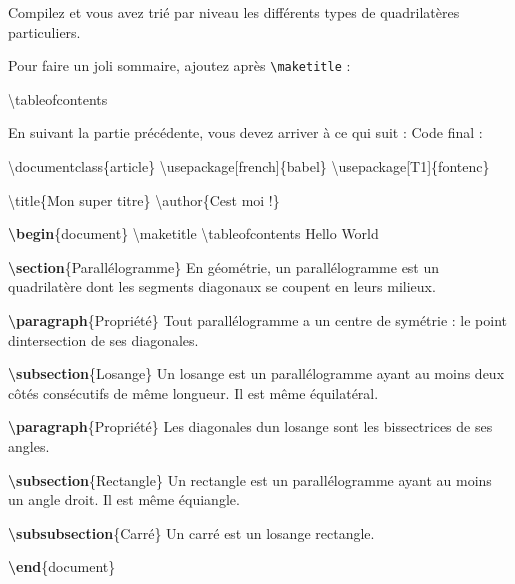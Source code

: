 \documentclass[A4paper
]{article}
\newenvironment{Shaded}{}{}
\newcommand{\BuiltInTok}[1]{#1}
\newcommand{\ExtensionTok}[1]{#1}
\newcommand{\FunctionTok}[1]{\textcolor[rgb]{0.02,0.16,0.49}{#1}}
\newcommand{\KeywordTok}[1]{\textcolor[rgb]{0.00,0.44,0.13}{\textbf{#1}}}
\newcommand{\NormalTok}[1]{#1}
\begin{document}
Compilez et vous avez trié par niveau les différents types de
quadrilatères particuliers.

Pour faire un joli sommaire, ajoutez après
\texttt{\textbackslash{}maketitle} :

\begin{Shaded}
\begin{Highlighting}[]
\FunctionTok{\textbackslash{}tableofcontents}
\end{Highlighting}
\end{Shaded}

En suivant la partie précédente, vous devez arriver à ce qui suit : Code
final :

\begin{Shaded}
\begin{Highlighting}[]
\BuiltInTok{\textbackslash{}documentclass}\NormalTok{\{}\ExtensionTok{article}\NormalTok{\}}
\BuiltInTok{\textbackslash{}usepackage}\NormalTok{[french]\{}\ExtensionTok{babel}\NormalTok{\}}
\BuiltInTok{\textbackslash{}usepackage}\NormalTok{[T1]\{}\ExtensionTok{fontenc}\NormalTok{\}}

\FunctionTok{\textbackslash{}title}\NormalTok{\{Mon super titre\}}
\FunctionTok{\textbackslash{}author}\NormalTok{\{C\textquotesingle{}est moi !\}}

\KeywordTok{\textbackslash{}begin}\NormalTok{\{}\ExtensionTok{document}\NormalTok{\}}
\FunctionTok{\textbackslash{}maketitle}
\FunctionTok{\textbackslash{}tableofcontents}
\NormalTok{Hello World }

\KeywordTok{\textbackslash{}section}\NormalTok{\{Parallélogramme\}}
\NormalTok{En géométrie, un parallélogramme est un quadrilatère dont les segments diagonaux se coupent en leurs milieux.}

\KeywordTok{\textbackslash{}paragraph}\NormalTok{\{Propriété\}}
\NormalTok{Tout parallélogramme a un centre de symétrie : le point d\textquotesingle{}intersection de ses diagonales.}

\KeywordTok{\textbackslash{}subsection}\NormalTok{\{Losange\}}
\NormalTok{Un losange est un parallélogramme ayant au moins deux côtés consécutifs de même longueur. Il est même équilatéral.}

\KeywordTok{\textbackslash{}paragraph}\NormalTok{\{Propriété\} Les diagonales d\textquotesingle{}un losange sont les bissectrices de ses angles.}

\KeywordTok{\textbackslash{}subsection}\NormalTok{\{Rectangle\}}
\NormalTok{Un rectangle est un parallélogramme ayant au moins un angle droit. Il est même équiangle.}

\KeywordTok{\textbackslash{}subsubsection}\NormalTok{\{Carré\}}
\NormalTok{Un carré est un losange rectangle.}

\KeywordTok{\textbackslash{}end}\NormalTok{\{}\ExtensionTok{document}\NormalTok{\}}
\end{Highlighting}
\end{Shaded}
\end{document}

